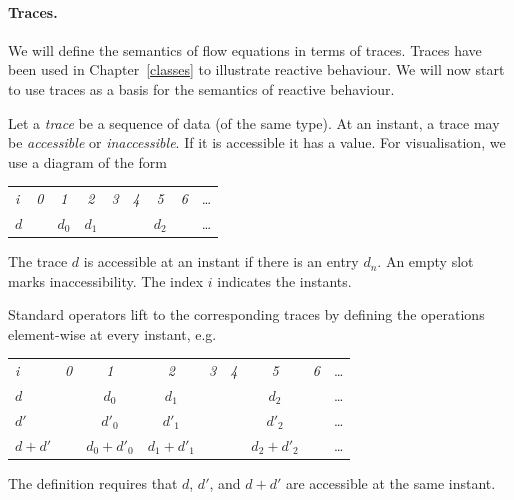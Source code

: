 \paragraph{Traces.} We will define the semantics of flow equations 
in terms of traces. Traces have been used in Chapter~\ref{classes} to
illustrate reactive behaviour. We will now start to use traces as a basis
for the semantics of reactive behaviour.

Let a \emph{trace} be a sequence of data (of the same type). At an instant,
a trace may be \emph{accessible} or \emph{inaccessible}. If it is accessible it has a value. For visualisation, we use a diagram of the form
\begin{center}
  \leavevmode
  \begin{tabular}[]{l@{\quad}||@{\quad} cccccccc}
    \hline\hline   
     \hbox{{\footnotesize \textit{i}}} &{\footnotesize \textit{0}}
     &{\footnotesize \textit{1}}&{\footnotesize \textit{2}}
     &{\footnotesize \textit{3}}&{\footnotesize \textit{4}}
     &{\footnotesize \textit{5}}&{\footnotesize \textit{6}}&\ldots
   \\  
    \hbox{$d$} &&$d_0$&$d_{1}$&&&$d_2$&&\ldots
   \\
   \hline\hline
  \end{tabular}
\end{center}
The trace $d$ is accessible at an instant if there is an entry $d_{n}$. An empty slot marks inaccessibility. The index $i$ indicates the instants.


Standard operators lift to the corresponding traces by defining the operations
element-wise at every instant, e.g.
\begin{center}
  \leavevmode
  \begin{tabular}[]{l@{\quad}||@{\quad} cccccccc}
    \hline\hline
     \hbox{{\footnotesize \textit{i}}} &{\footnotesize \textit{0}}
     &{\footnotesize \textit{1}}&{\footnotesize \textit{2}}
     &{\footnotesize \textit{3}}&{\footnotesize \textit{4}}
     &{\footnotesize \textit{5}}&{\footnotesize \textit{6}}&\ldots
   \\  
    \hbox{$d$} &&$d_0$&$d_1$&&&$d_2$&&\ldots
   \\
    \hbox{$d'$} &&$d'_0$&$d'_1$&&&$d'_2$&&\ldots
   \\
    \hbox{$d + d'$} 
    &&$d_0+d'_0$&$d_1+d'_1$&&&$d_2+d'_2$&&\ldots
   \\ 
   \hline\hline
  \end{tabular}
\end{center}
The definition requires that $d$, $d'$, and $d + d'$ are accessible at the same instant. 


